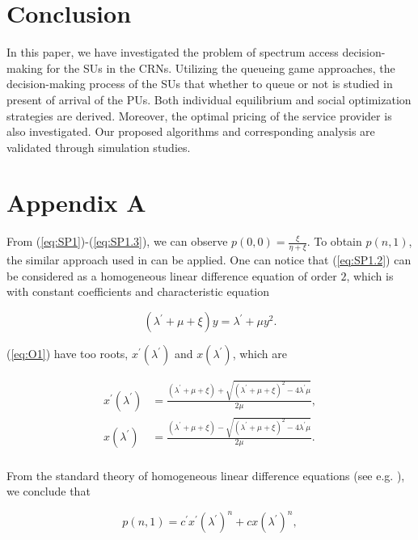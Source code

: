 \documentclass[journal]{IEEEtran}
\begin{document}
\section{Conclusion}
In this paper, we have investigated the problem of spectrum access
decision-making for the SUs in the CRNs. Utilizing
the queueing game approaches, the decision-making process of the SUs that
whether to queue or not is studied in present of arrival of the PUs.
Both individual equilibrium and social optimization strategies are
derived. Moreover, the optimal pricing of the service provider is also
investigated. Our proposed algorithms and corresponding analysis
are validated through simulation studies.


\section*{Appendix A}

From (\ref{eq:SP1})-(\ref{eq:SP1.3}), we can observe
$p(0,0) = \frac{\xi}{\eta+\xi}$. To obtain $p(n,1)$, the similar
approach used in \cite[pp. 578]{Boudali} can be applied. One can notice
that (\ref{eq:SP1.2}) can be considered as a homogeneous linear
difference equation of order $2$, which is with constant
coefficients and characteristic equation

\begin{equation}
\label{eq:O1} (\lambda^{'} + \mu + \xi)y = \lambda^{'}+ \mu y^2.
\end{equation}

\noindent (\ref{eq:O1}) have too roots, $x^{'}(\lambda^{'})$ and
$x(\lambda^{'})$, which are

\begin{equation}
\begin{split}
\label{eq:O2}
x^{'}(\lambda^{'} ) & =  \frac{(\lambda^{'} + \mu + \xi) + \sqrt{(\lambda^{'} + \mu + \xi)^2 - 4 \lambda^{'}  \mu}}{2\mu}, \\
x(\lambda^{'} ) & =  \frac{(\lambda^{'} + \mu + \xi) -\sqrt{(\lambda^{'} + \mu + \xi)^2 - 4 \lambda^{'}  \mu}}{2\mu}. \\
\end{split}
\end{equation}

From the standard theory of homogeneous linear difference
equations (see e.g. \cite[Sec 2.3]{Elaydi}), we conclude that

\begin{equation}
\label{eq:O3} p(n,1) = c^{'}x^{'}(\lambda^{'} )^n + c
x(\lambda^{'} )^n,
\end{equation}
\end{document}
